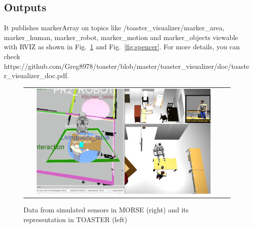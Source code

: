 \documentclass[a4paper]{article}
\begin{document}
\subsection{Outputs}
It publishes markerArray on topics like /toaster\_visualizer/marker\_area, marker\_human, marker\_robot, marker\_motion and marker\_objects viewable with RVIZ as shown in Fig.~\ref{fig:simu} and Fig.~\ref{fig:spencer}. For more details, you can check https://github.com/Greg8978/toaster/blob/master/toaster\_visualizer/doc/toaster\_visualizer\_doc.pdf.
 \begin{figure}[ht!]

 \centering
 \begin{tabular}{cc}
  \includegraphics[width=0.9\textwidth]{img/tosaster.jpg}
 \end{tabular}
   \vspace{-8pt}
 \caption{Data from simulated sensors in MORSE (right) and its representation in TOASTER (left)}
 \label{fig:simu}
  \vspace{-10pt}
 \end{figure}
 
\end{document}
